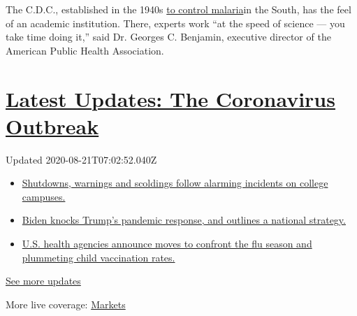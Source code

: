 The C.D.C., established in the 1940s
\href{https://www.cdc.gov/malaria/about/history/history_cdc.html}{to
control malaria}in the South, has the feel of an academic institution.
There, experts work ``at the speed of science --- you take time doing
it,'' said Dr. Georges C. Benjamin, executive director of the American
Public Health Association.

\hypertarget{latest-updates-the-coronavirus-outbreak}{%
\section{\texorpdfstring{\href{https://www.nytimes3xbfgragh.onion/2020/08/20/world/coronavirus-covid.html?action=click\&pgtype=Article\&state=default\&region=MAIN_CONTENT_1\&context=storylines_live_updates}{Latest
Updates: The Coronavirus
Outbreak}}{Latest Updates: The Coronavirus Outbreak}}\label{latest-updates-the-coronavirus-outbreak}}

Updated 2020-08-21T07:02:52.040Z

\begin{itemize}
\tightlist
\item
  \href{https://www.nytimes3xbfgragh.onion/2020/08/20/world/coronavirus-covid.html?action=click\&pgtype=Article\&state=default\&region=MAIN_CONTENT_1\&context=storylines_live_updates\#link-68774d88}{Shutdowns,
  warnings and scoldings follow alarming incidents on college campuses.}
\item
  \href{https://www.nytimes3xbfgragh.onion/2020/08/20/world/coronavirus-covid.html?action=click\&pgtype=Article\&state=default\&region=MAIN_CONTENT_1\&context=storylines_live_updates\#link-26b58724}{Biden
  knocks Trump's pandemic response, and outlines a national strategy.}
\item
  \href{https://www.nytimes3xbfgragh.onion/2020/08/20/world/coronavirus-covid.html?action=click\&pgtype=Article\&state=default\&region=MAIN_CONTENT_1\&context=storylines_live_updates\#link-4e542da3}{U.S.
  health agencies announce moves to confront the flu season and
  plummeting child vaccination rates.}
\end{itemize}

\href{https://www.nytimes3xbfgragh.onion/2020/08/20/world/coronavirus-covid.html?action=click\&pgtype=Article\&state=default\&region=MAIN_CONTENT_1\&context=storylines_live_updates}{See
more updates}

More live coverage:
\href{https://www.nytimes3xbfgragh.onion/live/2020/08/20/business/stock-market-today-coronavirus?action=click\&pgtype=Article\&state=default\&region=MAIN_CONTENT_1\&context=storylines_live_updates}{Markets}

